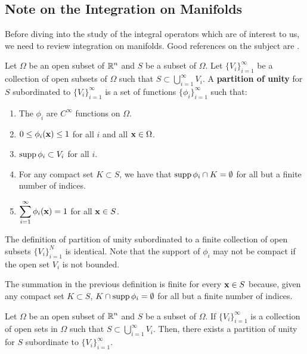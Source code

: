 \subsection{Note on the Integration on Manifolds} \label{pot_int_man}

Before diving into the study of the integral operators which are of
interest to us, we need to review integration on manifolds.  Good
references on the subject are \cite{Ab,Sp}.

\begin{defn} \label{pot_part_unity}
Let $\Omega$ be an open subset of $\displaystyle \mathbb{R}^n$ and $S$ be a subset of
$\Omega$.  Let $\displaystyle \{V_i\}_{i=1}^\infty$ be a collection of
open subsets of $\Omega$ such that
$\displaystyle S \subset \bigcup_{i=1}^\infty V_i$.
A {\bfseries partition of unity}
for $S$ subordinated to $\displaystyle \{V_i\}_{i=1}^\infty$ is a set
of functions $\displaystyle \{\phi_i\}_{i=1}^\infty$ such that:
\begin{enumerate}
\item The $\phi_i$ are $\displaystyle C^\infty$ functions on $\Omega$.
\item $0 \leq \phi_i(\mathbf{x}) \leq 1$ for all $i$ and all $\mathbf{x} \in \Omega$.
\item $\operatorname{supp} \phi_i \subset V_i$ for all $i$.
\item For any compact set $K \subset S$, we have that
$\operatorname{supp} \phi_i \cap K = \emptyset$ for all but a finite number of indices.
\item $\displaystyle \sum_{i=1}^\infty \phi_i(\mathbf{x}) = 1$ for all
$\mathbf{x}\in S$.
\end{enumerate}
The definition of partition of unity subordinated to a finite
collection of open subsets $\displaystyle \{V_i\}_{i=1}^N$ is identical.
Note that the support of $\phi_i$ may not be compact if the open set
$V_i$ is not bounded.
\end{defn}

The summation in the previous definition is finite for every
$\mathbf{x} \in S$ because, given any compact set $K\subset S$,
$K\cap \operatorname{supp} \phi_i = \emptyset$ for all but a finite number of indices.

\begin{prop}
Let $\Omega$ be an open subset of $\displaystyle \mathbb{R}^n$ and $S$ be a subset of
$\Omega$.  If $\displaystyle \{ V_i\}_{i=1}^\infty$ is a collection
of open sets in $\Omega$ such that
$\displaystyle S \subset \bigcup_{i=1}^\infty V_i$.
Then, there exists a partition of unity for $S$
subordinate to $\displaystyle \{ V_i\}_{i=1}^\infty$.
\end{prop}

